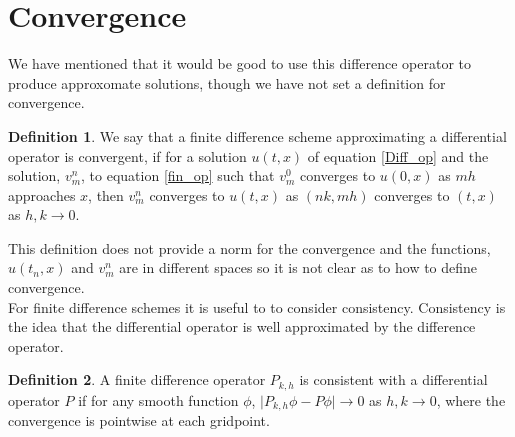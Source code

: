 \documentclass[12pt]{article}
\theoremstyle{definition}
\newtheorem{definition}{Definition}
\begin{document}
\section{Convergence}
We have mentioned that it would be good to use this difference operator to produce approxomate solutions, though we have not set a definition for convergence.
\begin{definition}
We say that a finite difference scheme approximating a differential operator is convergent, if for a solution $u(t,x)$ of equation \ref{Diff_op} and the solution, $v_m^n$, to equation \ref{fin_op} such that $v_m^0$ converges to $u(0,x)$ as $mh$ approaches $x$, then $v_m^n$ converges to $u(t,x)$ as $(nk,mh)$ converges to $(t,x)$ as $h,k \rightarrow 0$.
\end{definition} 

This definition does not provide a norm for the convergence and the functions, $u(t_n,x)$ and $v_m^n$ are in different spaces so it is not clear as to how to define convergence.\\ 
For finite difference schemes it is useful to to consider consistency. Consistency is the idea that the differential operator is well approximated by the difference operator.
\begin{definition}
A finite difference operator $P_{k,h}$ is consistent with a differential operator $P$ if for any smooth function $\phi$, $\lvert P_{k,h}\phi-P\phi\rvert \rightarrow 0$ as $h,k\rightarrow 0$,
where the convergence is pointwise at each gridpoint.
\end{definition} 
\end{document}

